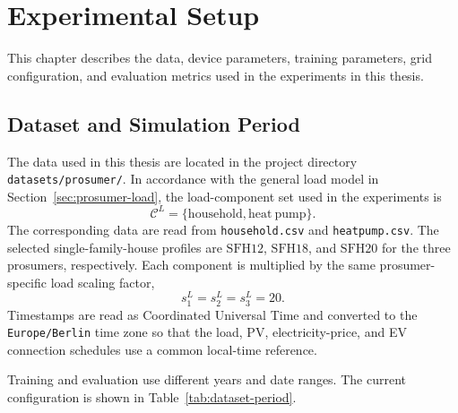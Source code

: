 ﻿%

\chapter{Experimental Setup}\label{chapter:experimental-setup}

This chapter describes the data, device parameters, training parameters, grid configuration, and evaluation metrics used in the experiments in this thesis.

\section{Dataset and Simulation Period}

The data used in this thesis are located in the project directory \texttt{datasets/prosumer/}. In accordance with the general load model in Section~\ref{sec:prosumer-load}, the load-component set used in the experiments is
\[
  \mathcal{C}^{L}=\{\mathrm{household},\mathrm{heat\ pump}\}.
\]
The corresponding data are read from \texttt{household.csv} and \texttt{heatpump.csv}. The selected single-family-house profiles are \(\mathrm{SFH12}\), \(\mathrm{SFH18}\), and \(\mathrm{SFH20}\) for the three prosumers, respectively. Each component is multiplied by the same prosumer-specific load scaling factor,
\[
  s^L_1=s^L_2=s^L_3=20.
\]
Timestamps are read as Coordinated Universal Time and converted to the \texttt{Europe/Berlin} time zone so that the load, PV, electricity-price, and EV connection schedules use a common local-time reference.

Training and evaluation use different years and date ranges. The current configuration is shown in Table~\ref{tab:dataset-period}.

